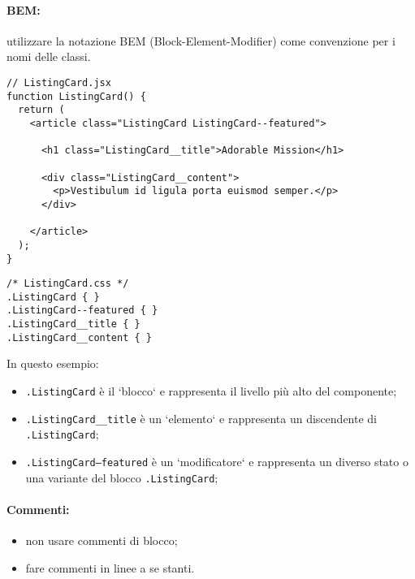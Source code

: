 \documentclass[../ProcessiPrimari.tex]{subfiles}
\begin{document}
\paragraph*{BEM:}
utilizzare la notazione BEM (Block-Element-Modifier) come convenzione per i nomi delle classi.
\begin{center}{
\begin{minipage}{13.5cm}
\begin{Verbatim}[frame=single]
// ListingCard.jsx
function ListingCard() {
  return (
    <article class="ListingCard ListingCard--featured">

      <h1 class="ListingCard__title">Adorable Mission</h1>

      <div class="ListingCard__content">
        <p>Vestibulum id ligula porta euismod semper.</p>
      </div>

    </article>
  );
}
\end{Verbatim}
\end{minipage}
}
\end{center}
\begin{center}{
\begin{minipage}{13.5cm}
\begin{Verbatim}[frame=single]
/* ListingCard.css */
.ListingCard { }
.ListingCard--featured { }
.ListingCard__title { }
.ListingCard__content { }
\end{Verbatim}
\end{minipage}
}
\end{center}
In questo esempio:
\begin{itemize}
	\item \texttt{.ListingCard} è il `blocco` e rappresenta il livello più alto del componente;
	\item \texttt{.ListingCard\_\_title} è un `elemento` e rappresenta un discendente di \texttt{.ListingCard};
	\item \texttt{.ListingCard--featured} è un `modificatore` e rappresenta un diverso stato o una variante del blocco \texttt{.ListingCard};
\end{itemize}
\paragraph*{Commenti:}
\begin{itemize}
	\item non usare commenti di blocco;
	\item fare commenti in linee a se stanti.
\end{itemize}
\end{document}
